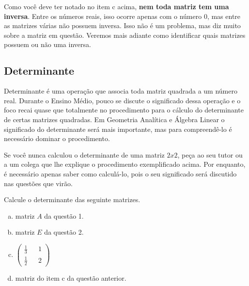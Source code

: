 \documentclass[main_estudante.tex]{subfiles}
\begin{document}
Como você deve ter notado no item c acima, \textbf{nem toda matriz tem uma inversa}. Entre os números reais, isso ocorre apenas com o número 0, mas entre as matrizes várias não possuem inversa. Isso não é um problema, mas diz muito sobre a matriz em questão. Veremos mais adiante como identificar quais matrizes possuem ou não uma inversa.

\subsection*{Determinante}

Determinante é uma operação que associa toda matriz quadrada a um número real. Durante o Ensino Médio, pouco se discute o significado dessa operação e o foco recai quase que totalmente no procedimento para o cálculo do determinante de certas matrizes quadradas. Em Geometria Analítica e Álgebra Linear o significado do determinante será mais importante, mas para compreendê-lo é necessário dominar o procedimento.

\noindent{}

Se você nunca calculou o determinante de uma matriz $2x2$, peça ao seu tutor ou a um colega que lhe explique o procedimento exemplificado acima. Por enquanto, é necessário apenas saber como calculá-lo, pois o seu significado será discutido nas questões que virão.

\begin{questao}
Calcule o determinante das seguinte matrizes.
\begin{enumerate}[a)]
\item matriz $A$ da questão 1.
\item matriz $E$ da questão 2.
\item $\begin{pmatrix} \frac{1}{3} && 1 \\ \frac{1}{2} && 2 \end{pmatrix}$
\item matriz do item c da questão anterior.
\end{enumerate}
\end{questao}
\end{document}
